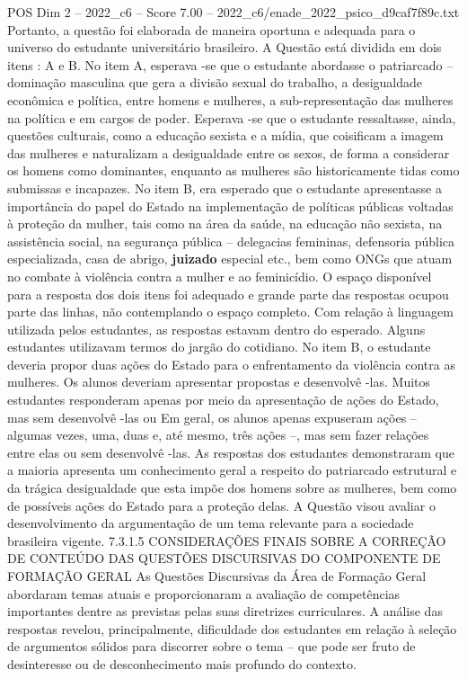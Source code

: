 \begin{textsample}{POS Dim 2 – 2022\_c6 – Score 7.00 – 2022\_c6/enade\_2022\_psico\_d9caf7f89c.txt}
Portanto, a questão foi elaborada de maneira oportuna e adequada para o universo do estudante universitário brasileiro.
A Questão está dividida em dois itens : A e B.
No item A, esperava -se que o estudante abordasse o patriarcado – dominação masculina que gera a divisão sexual do trabalho, a desigualdade econômica e política, entre homens e mulheres, a sub-representação das mulheres na política e em cargos de poder.
Esperava -se que o estudante ressaltasse, ainda, questões culturais, como a educação sexista e a mídia, que coisificam a imagem das mulheres e naturalizam a desigualdade entre os sexos, de forma a considerar os homens como dominantes, enquanto as mulheres são historicamente tidas como submissas e incapazes.
No item B, era esperado que o estudante apresentasse a importância do papel do Estado na implementação de políticas públicas voltadas à proteção da mulher, tais como na área da saúde, na educação não sexista, na assistência social, na segurança pública – delegacias femininas, defensoria pública especializada, casa de abrigo, \textbf{juizado} especial etc., bem como ONGs que atuam no combate à violência contra a mulher e ao feminicídio.
O espaço disponível para a resposta dos dois itens foi adequado e grande parte das respostas ocupou parte das linhas, não contemplando o espaço completo.
Com relação à linguagem utilizada pelos estudantes, as respostas estavam dentro do esperado.
Alguns estudantes utilizavam termos do jargão do cotidiano.
No item B, o estudante deveria propor duas ações do Estado para o enfrentamento da violência contra as mulheres.
Os alunos deveriam apresentar propostas e desenvolvê -las.
Muitos estudantes responderam apenas por meio da apresentação de ações do Estado, mas sem desenvolvê -las ou Em geral, os alunos apenas expuseram ações – algumas vezes, uma, duas e, até mesmo, três ações –, mas sem fazer relações entre elas ou sem desenvolvê -las.
As respostas dos estudantes demonstraram que a maioria apresenta um conhecimento geral a respeito do patriarcado estrutural e da trágica desigualdade que esta impõe dos homens sobre as mulheres, bem como de possíveis ações do Estado para a proteção delas.
A Questão visou avaliar o desenvolvimento da argumentação de um tema relevante para a sociedade brasileira vigente. 7.3.1.5 CONSIDERAÇÕES FINAIS SOBRE A CORREÇÃO DE CONTEÚDO DAS QUESTÕES DISCURSIVAS DO COMPONENTE DE FORMAÇÃO GERAL As Questões Discursivas da Área de Formação Geral abordaram temas atuais e proporcionaram a avaliação de competências importantes dentre as previstas pelas suas diretrizes curriculares.
A análise das respostas revelou, principalmente, dificuldade dos estudantes em relação à seleção de argumentos sólidos para discorrer sobre o tema – que pode ser fruto de desinteresse ou de desconhecimento mais profundo do contexto.

\end{textsample}
